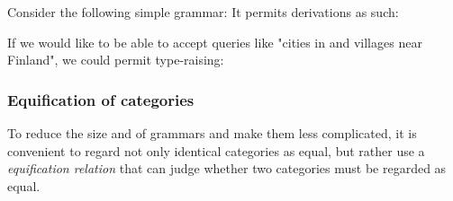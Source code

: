 \documentclass[main.tex]{subfiles}
\begin{document}
\begin{example}
    Consider the following simple grammar:
    It permits derivations as such:

    If we would like to be able to accept queries like "cities in and villages
    near Finland", we could permit type-raising:

\end{example}

\subsubsection{Equification of categories}
\label{hack:equification}
To reduce the size and of grammars and make them less complicated, 
it is convenient to regard
not only identical categories as equal, but rather use a \emph{equification
relation} that can judge whether two categories must be regarded as equal.
\end{document}
